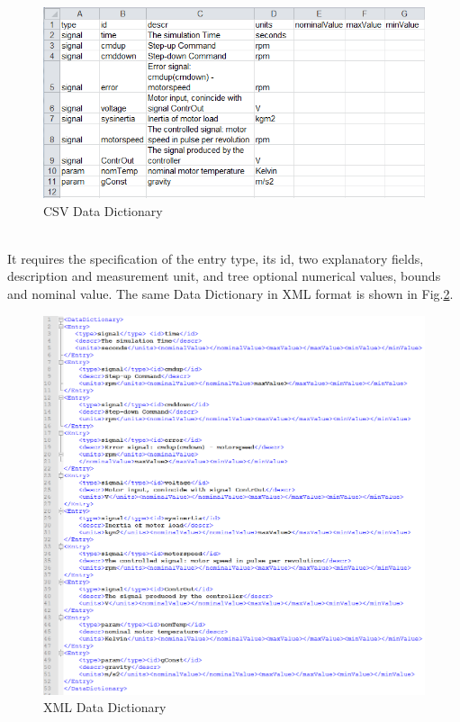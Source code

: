 \begin{figure}[!h]
\centering
\includegraphics[width=.9\textwidth]{Figs/ddcsv.PNG}
\caption{CSV Data Dictionary}
\label{fig:ddcsv}
\end{figure}
\noindent
\\
It requires the specification of the entry type, its id, two explanatory fields, description and measurement unit, and tree optional numerical values, bounds and nominal value. The same Data Dictionary in XML format is shown in Fig.\ref{fig:ddxml}. 

\begin{figure}[!h]
\centering
\includegraphics[width=\textwidth]{Figs/ddxml.PNG}
\caption{XML Data Dictionary}
\label{fig:ddxml}
\end{figure}

